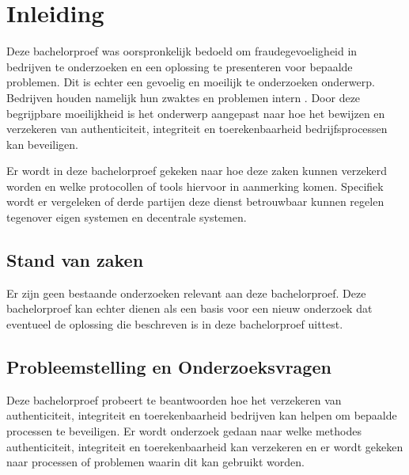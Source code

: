 
\chapter{Inleiding}
\label{ch:inleiding}

Deze bachelorproef was oorspronkelijk bedoeld om fraudegevoeligheid in bedrijven
te onderzoeken en een oplossing te presenteren voor bepaalde problemen. Dit is
echter een gevoelig en moeilijk te onderzoeken onderwerp. Bedrijven houden
namelijk hun zwaktes en problemen intern \autocite{EconomicCrimeSurvey}. Door
deze begrijpbare moeilijkheid is het onderwerp aangepast naar hoe het bewijzen
en
verzekeren van \gls{authenticiteit}, \gls{integriteit} en \gls{toerekenbaarheid}
bedrijfsprocessen
kan beveiligen.

Er wordt in deze bachelorproef gekeken naar hoe deze zaken kunnen verzekerd
worden en welke protocollen of tools hiervoor in aanmerking komen. Specifiek
wordt er vergeleken of derde partijen deze dienst betrouwbaar kunnen regelen
tegenover eigen systemen en decentrale systemen.

\section{Stand van zaken}
\label{sec:stand-van-zaken}
Er zijn geen bestaande onderzoeken relevant aan deze bachelorproef. Deze
bachelorproef kan echter dienen als een basis voor een nieuw onderzoek dat
eventueel de oplossing die beschreven is in deze bachelorproef uittest.



\section{Probleemstelling en Onderzoeksvragen}
\label{sec:onderzoeksvragen}

Deze bachelorproef probeert te beantwoorden hoe het verzekeren van
\gls{authenticiteit}, \gls{integriteit} en \gls{toerekenbaarheid} bedrijven
kan helpen om
bepaalde processen te beveiligen. Er wordt onderzoek gedaan naar welke methodes
\gls{authenticiteit}, \gls{integriteit} en \gls{toerekenbaarheid} kan verzekeren
en er wordt gekeken naar
processen of problemen waarin dit kan gebruikt worden.

